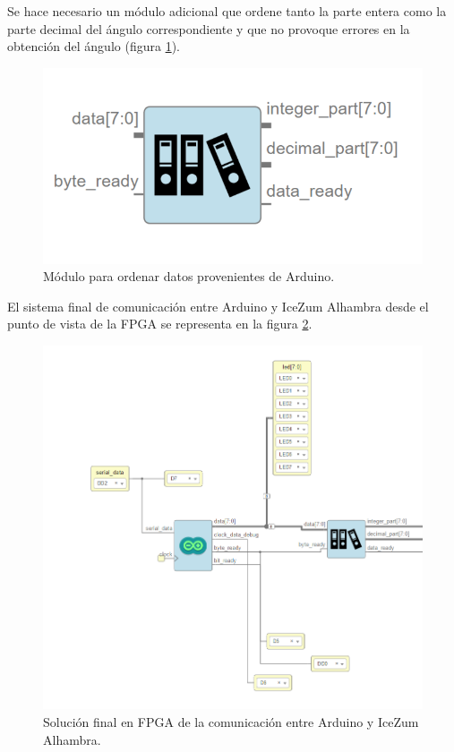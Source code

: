 Se hace necesario un módulo adicional que ordene tanto la parte entera como la parte decimal del ángulo correspondiente y que no provoque errores en la obtención del ángulo (figura \ref{fig:arrange_arduino}). 

\begin{figure}[H]
	\center
	\includegraphics[scale=0.4]{imagenes/Balancing_robot/arrange_arduino.PNG}
	\caption{Módulo para ordenar datos provenientes de Arduino.}
	\label{fig:arrange_arduino}
\end{figure}


El sistema final de comunicación entre Arduino y IceZum Alhambra desde el punto de vista de la FPGA se representa en la figura \ref{fig:arduino_arrange}.

\begin{figure}[H]
	\center
	\includegraphics[scale=0.6]{imagenes/Balancing_robot/arduino_arrange.PNG}
	\caption{Solución final en FPGA de la comunicación entre Arduino y IceZum Alhambra.}
	\label{fig:arduino_arrange}
\end{figure}










